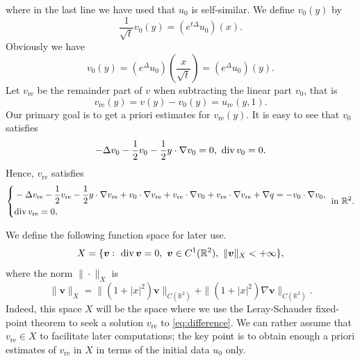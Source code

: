 \documentclass[12pt]{amsart}
\renewcommand{\div}{{\rm div \thinspace }}
\numberwithin{equation}{section}              %
\theoremstyle{remark}
\newcommand{\Bv}{{\boldsymbol{v}}}
\begin{document}
	where in the last line we have used that $u_0$ is self-similar.
	We define $ v_0(y)$ by
	\begin{equation*}
		\frac{1}{\sqrt{t}}v_0(y)=  (e^{t\Delta}u_0)(x).
	\end{equation*}
Obviously we have
	\begin{equation}\label{eq:defofv1}
		v_0(y) = (e^{\Delta}u_0)\left(\frac{x}{\sqrt{t}}\right) =  (e^{\Delta}u_0)(y).
	\end{equation}
	Let $	v_{\text{re}}$ be the remainder part of $v$ when subtracting the linear part $v_0$, that is
	\begin{equation}\label{eq:deforre}
		v_{\text{re}}(y)=v(y)- v_0(y) = u_{\text{re}}(y,1).
	\end{equation}
	Our primary goal is to get a priori estimates for $	v_{\text{re}}(y)$.
	It is easy to see that $v_0$ satisfies
	\begin{equation}\label{eq:equforv1}
		-\Delta  v_0 -\frac{1}{2} v_0 -\frac{1}{2}y\cdot \nabla  v_0 = 0, ~\div v_0=0.
	\end{equation}
	Hence, $	v_{\text{re}}$ satisfies
	\begin{equation}\label{eq:difference}
		\left\{
		\begin{aligned}
			&-\Delta v_{\text{re}} -\frac{1}{2}v_{\text{re}} -\frac{1}{2}y\cdot \nabla v_{\text{re}}+  v_0\cdot \nabla v_{\text{re}} + v_{\text{re}}\cdot \nabla  v_0 + v_{\text{re}}\cdot \nabla v_{\text{re}} +\nabla q=- v_0\cdot\nabla  v_0, \\
			&  \div v_{\text{re}}=0,
		\end{aligned} 
		\right. \textrm{ in } \mathbb{R}^2.
	\end{equation}

    We define  the following function space for later use.
			\begin{equation}\label{eq:defiofX}
				X=\{ \Bv:\ \div \Bv =0, \ \Bv\in C^1(\mathbb{R}^2), ~ \|\Bv\|_{X}<+\infty\},
			\end{equation}
			where the norm $\|\cdot\|_X$ is 
			\begin{equation}\label{eq:defofnorm}
				\|\Bv\|_{X}= \|(1+|x|^2)\Bv\|_{C(\mathbb{R}^2)} +\|(1+|x|^2)\nabla \Bv\|_{C(\mathbb{R}^2)}.
			\end{equation}
     Indeed, this space $X$ will be the space where we use the Leray-Schauder fixed-point theorem to seek a solution $v_{\text{re}}$ to \eqref{eq:difference}. We can rather assume that $v_{\text{re}}\in X$ to facilitate later computations; the key point is to obtain enough a priori estimates of $v_{\text{re}}$ in $X$ in terms of the initial data $u_0$ only.
     
\end{document}
